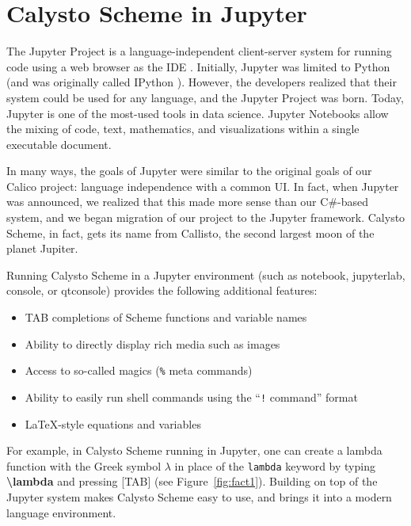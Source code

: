 \documentclass[acmsmall,screen,authorversion]{acmart}
\begin{document}

\section{Calysto Scheme in Jupyter}

The Jupyter Project is a language-independent client-server system for
running code using a web browser as the IDE
\cite{Kluyver2016jupyter}. Initially, Jupyter was limited to Python
(and was originally called IPython \cite{PER-GRA:2007}). However, the
developers realized that their system could be used for any language,
and the Jupyter Project was born. Today, Jupyter is one of the
most-used tools in data science. Jupyter Notebooks allow the mixing of
code, text, mathematics, and visualizations within a single executable
document.

In many ways, the goals of Jupyter were similar to the original goals of our
Calico project: language independence with a common UI. In fact, when Jupyter
was announced, we realized that this made more sense than our C\#-based system,
and we began migration of our project to the Jupyter framework. Calysto Scheme,
in fact, gets its name from Callisto, the second largest moon of the planet
Jupiter.

Running Calysto Scheme in a Jupyter environment (such as notebook, jupyterlab,
console, or qtconsole) provides the following additional features:

\begin{itemize}
\item TAB completions of Scheme functions and variable names
\item Ability to directly display rich media such as images
\item Access to so-called magics (\texttt{\%} meta commands)
\item Ability to easily run shell commands using the ``\texttt{!} command'' format
\item \LaTeX-style equations and variables
\end{itemize}

For example, in Calysto Scheme running in Jupyter, one can create a lambda
function with the Greek symbol $\lambda$ in place of the \texttt{lambda}
keyword by typing \textbf{\textbackslash lambda} and pressing [TAB] (see
Figure~\ref{fig:fact1}). Building on top of the Jupyter system makes Calysto
Scheme easy to use, and brings it into a modern language environment.
\end{document}
